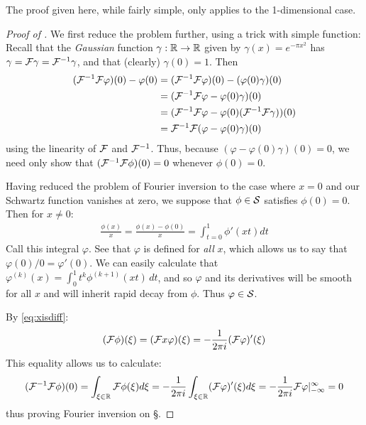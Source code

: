       \begin{rmk}
        The proof given here, while fairly simple, only applies to the 1-dimensional case. 
      \end{rmk}
      \begin{proof}[Proof of ]
        We first reduce the problem further, using a trick with simple function:
        Recall that the \emph{Gaussian} function $\gamma:\R\rightarrow\R$ given by $\gamma(x) = e^{-\pi x^2}$ has $\gamma=\F\gamma=\F^{-1}\gamma$, and that (clearly) $\gamma(0)=1$.
        Then 
        \begin{align*}
          (\F^{-1}\F\varphi)(0) - \varphi(0) &= (\F^{-1}\F\varphi)(0) - (\varphi(0)\gamma)(0)\\
          &= (\F^{-1}\F\varphi - \varphi(0)\gamma)(0)\\
          &= (\F^{-1}\F\varphi - \varphi(0)(\F^{-1}\F\gamma))(0)\\
          &= \F^{-1}\F(\varphi-\varphi(0)\gamma)(0)
        \end{align*}
        using the linearity of $\F$ and $\F^{-1}$.
        Thus, because $(\varphi-\varphi(0)\gamma)(0)=0$, we need only show that $(\F^{-1}\F\phi)(0) = 0$ whenever $\phi(0)=0$.

        Having reduced the problem of Fourier inversion to the case where $x=0$ and our Schwartz function vanishes at zero, we suppose that $\phi\in\S$ satisfies $\phi(0)=0$. 
        Then for $x\ne0$:
        \begin{align*}
          \frac{\phi(x)}{x} = \frac{\phi(x)-\phi(0)}{x} = \int_{t=0}^1 \phi'(xt)dt
        \end{align*}
        Call this integral $\varphi$.
        See that $\varphi$ is defined for \emph{all} $x$, which allows us to say that $\varphi(0)/0=\varphi'(0)$.
        We can easily calculate that $\varphi^{(k)}(x) = \int_0^1t^k\phi^{(k+1)}(xt)\,dt$, and so $\varphi$ and its derivatives will be smooth for all $x$ and will inherit rapid decay from $\phi$.
        Thus $\varphi\in\S$.

        By \eqref{eq:xisdiff}:
        \begin{align*}
          (\F\phi)(\xi) = (\F x\varphi)(\xi)= -\frac{1}{2\pi i}(\F\varphi)'(\xi)
        \end{align*}
        This equality allows us to calculate:
        \begin{align*}
          (\F^{-1}\F\phi)(0) = \int_{\xi\in\R} \F\phi(\xi)d\xi = -\frac{1}{2\pi i}\int_{\xi\in\R} (\F\varphi)'(\xi)d\xi = -\frac{1}{2\pi i} \F\varphi\vert_{-\infty}^\infty = 0
        \end{align*}
        thus proving Fourier inversion on \S.
      \end{proof}

